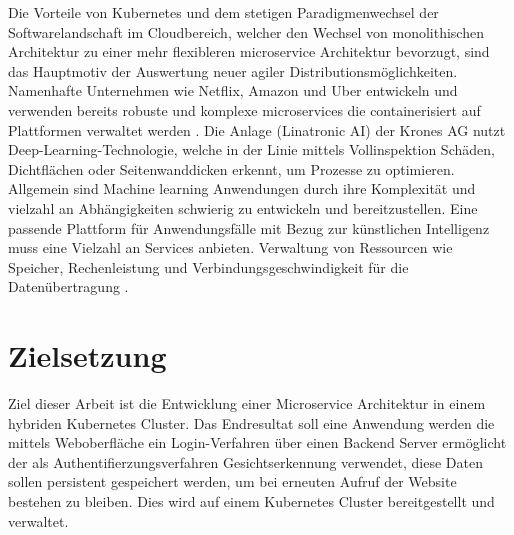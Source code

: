Die Vorteile von Kubernetes und dem stetigen Paradigmenwechsel der Softwarelandschaft im Cloudbereich, welcher
den Wechsel von monolithischen Architektur zu einer mehr flexibleren microservice Architektur
bevorzugt, sind das Hauptmotiv der Auswertung neuer agiler Distributionsmöglichkeiten.
Namenhafte Unternehmen wie Netflix, Amazon und Uber entwickeln und verwenden
bereits robuste und komplexe microservices die containerisiert auf Plattformen
verwaltet werden \cite{microservice}. 
Die Anlage (Linatronic AI) der Krones AG nutzt Deep-Learning-Technologie,
welche in der Linie mittels Vollinspektion Schäden, Dichtflächen oder Seitenwanddicken
erkennt, um Prozesse zu optimieren. Allgemein sind Machine learning Anwendungen durch ihre Komplexität
und vielzahl an Abhängigkeiten schwierig zu entwickeln und bereitzustellen. 
Eine passende Plattform für Anwendungsfälle mit Bezug zur künstlichen Intelligenz
muss eine Vielzahl an Services anbieten. Verwaltung von Ressourcen wie Speicher,
Rechenleistung und Verbindungsgeschwindigkeit für die Datenübertragung \cite{mlops}. 

\section{Zielsetzung}
Ziel dieser Arbeit ist die Entwicklung einer Microservice
Architektur in einem hybriden Kubernetes Cluster. Das Endresultat
soll eine Anwendung werden die mittels Weboberfläche ein Login-Verfahren
über einen Backend Server ermöglicht der als Authentifierzungsverfahren
Gesichtserkennung verwendet, diese Daten sollen persistent gespeichert werden,
um bei erneuten Aufruf der Website bestehen zu bleiben.
Dies wird auf einem Kubernetes Cluster bereitgestellt und verwaltet.



